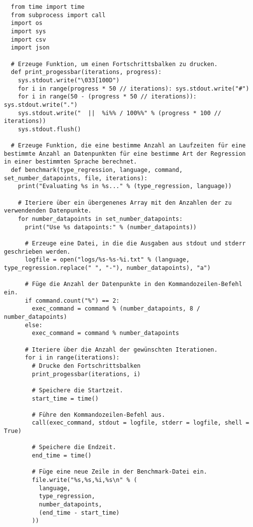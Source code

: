 \begin{verbatim}
  from time import time
  from subprocess import call
  import os
  import sys
  import csv
  import json

  # Erzeuge Funktion, um einen Fortschrittsbalken zu drucken.
  def print_progessbar(iterations, progress):
    sys.stdout.write("\033[100D")
    for i in range(progress * 50 // iterations): sys.stdout.write("#")
    for i in range(50 - (progress * 50 // iterations)): sys.stdout.write(".")
    sys.stdout.write("  ||  %i%% / 100%%" % (progress * 100 // iterations))
    sys.stdout.flush()

  # Erzeuge Funktion, die eine bestimme Anzahl an Laufzeiten für eine bestimmte Anzahl an Datenpunkten für eine bestimme Art der Regression in einer bestimmten Sprache berechnet.
  def benchmark(type_regression, language, command, set_number_datapoints, file, iterations):
    print("Evaluating %s in %s..." % (type_regression, language))

    # Iteriere über ein übergenenes Array mit den Anzahlen der zu verwendenden Datenpunkte.
    for number_datapoints in set_number_datapoints:
      print("Use %s datapoints:" % (number_datapoints))

      # Erzeuge eine Datei, in die die Ausgaben aus stdout und stderr geschrieben werden.
      logfile = open("logs/%s-%s-%i.txt" % (language, type_regression.replace(" ", "-"), number_datapoints), "a")

      # Füge die Anzahl der Datenpunkte in den Kommandozeilen-Befehl ein.
      if command.count("%") == 2:
        exec_command = command % (number_datapoints, 8 / number_datapoints)
      else:
        exec_command = command % number_datapoints

      # Iteriere über die Anzahl der gewünschten Iterationen.
      for i in range(iterations):
        # Drucke den Fortschrittsbalken
        print_progessbar(iterations, i)

        # Speichere die Startzeit.
        start_time = time()

        # Führe den Kommandozeilen-Befehl aus.
        call(exec_command, stdout = logfile, stderr = logfile, shell = True)

        # Speichere die Endzeit.
        end_time = time()

        # Füge eine neue Zeile in der Benchmark-Datei ein.
        file.write("%s,%s,%i,%s\n" % (
          language,
          type_regression,
          number_datapoints,
          (end_time - start_time)
        ))


\end{verbatim}
